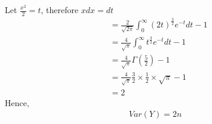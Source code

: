 \documentclass[a4paper]{article}
\begin{document}
Let $\frac{x^2}{2} = t$, therefore $xdx = dt$
\begin{equation*}
	\begin{split}
		&= \frac{2}{\sqrt{2\pi} } \int_0^{\infty} \left( 2t \right) ^{\frac{3}{2}} e^{-t}dt - 1\\
		&= \frac{4}{\sqrt{\pi} } \int_0^{\infty} t ^{\frac{3}{2}} e^{-t}dt - 1\\
		&= \frac{4}{\sqrt{\pi} } \Gamma\left( \frac{5}{2} \right) -1\\
		&= \frac{4}{\sqrt{\pi} } \frac{3}{2}\times \frac{1}{2}\times \sqrt{\pi} - 1\\
		&= 2
	\end{split}
\end{equation*}
Hence, 
\begin{equation*}
	\begin{split}
		Var\left( Y \right) = 2n
	\end{split}
\end{equation*}
\end{document}
